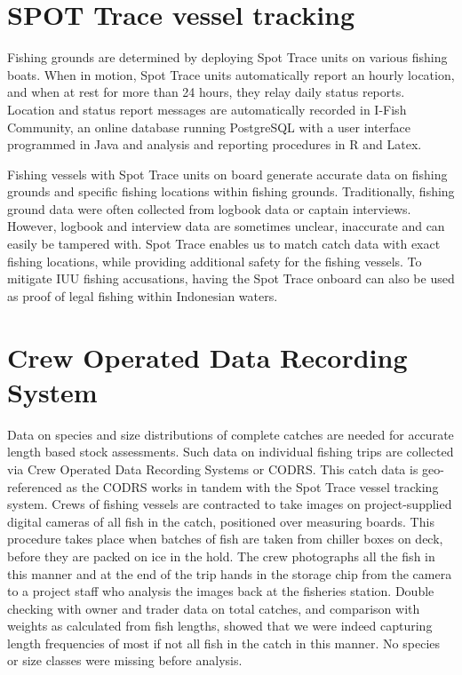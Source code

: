 \section{SPOT Trace vessel tracking}

Fishing grounds are determined by deploying Spot Trace units on various fishing boats. When in motion, Spot Trace units automatically report an hourly location, and when at rest for more than 24 hours, they relay daily status reports. Location and status report messages are automatically recorded in I-Fish Community, an online database running PostgreSQL with a user interface programmed in Java and analysis and reporting procedures in R and Latex.

Fishing vessels with Spot Trace units on board generate accurate data on fishing grounds and specific fishing locations within fishing grounds. Traditionally, fishing ground data were often collected from logbook data or captain interviews. However, logbook and interview data are sometimes unclear, inaccurate and can easily be tampered with. Spot Trace enables us to match catch data with exact fishing locations, while providing additional safety for the fishing vessels. To mitigate IUU fishing accusations, having the Spot Trace onboard can also be used as proof of legal fishing within Indonesian waters.


\section{Crew Operated Data Recording System}

Data on species and size distributions of complete catches are needed for accurate length based stock assessments. Such data on individual fishing trips are collected via Crew Operated Data Recording Systems or CODRS. This catch data is geo-referenced as the CODRS works in tandem with the Spot Trace vessel tracking system. Crews of fishing vessels are contracted to take images on project-supplied digital cameras of all fish in the catch, positioned over measuring boards. This procedure takes place when batches of fish are taken from chiller boxes on deck, before they are packed on ice in the hold. The crew photographs all the fish in this manner and at the end of the trip hands in the storage chip from the camera to a project staff who analysis the images back at the fisheries station. Double checking with owner and trader data on total catches, and comparison with weights as calculated from fish lengths, showed that we were indeed capturing length frequencies of most if not all fish in the catch in this manner. No species or size classes were missing before analysis.

